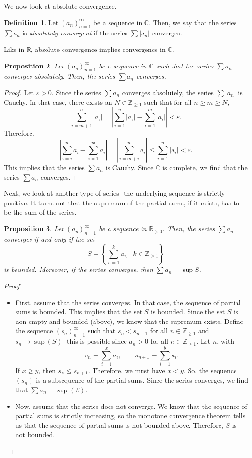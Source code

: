 \documentclass[a4paper, openany]{memoir}
\theoremstyle{definition}
\newtheorem{definition}{Definition}[section]
\theoremstyle{plain}
\newtheorem{proposition}[definition]{Proposition}
\begin{document}
We now look at absolute convergence.
\begin{definition}
Let $(a_n)_{n=1}^{\infty}$ be a sequence in $\mathbb{C}$. Then, we say that the series $\sum a_n$ is \emph{absolutely convergent} if the series $\sum |a_n|$ converges.
\end{definition}
\noindent Like in $\mathbb{R}$, absolute convergence implies convergence in $\mathbb{C}$.
\begin{proposition}
Let $(a_n)_{n=1}^{\infty}$ be a sequence in $\mathbb{C}$ such that the series $\sum a_n$ converges absolutely. Then, the series $\sum a_n$ converges.
\end{proposition}
\begin{proof}
Let $\varepsilon > 0$. Since the series $\sum a_n$ converges absolutely, the series $\sum |a_n|$ is Cauchy. In that case, there exists an $N \in \mathbb{Z}_{\geqslant 1}$ such that for all $n \geqslant m \geqslant N$,
\[\sum_{i=m+1}^n |a_i| = \left|\sum_{i=1}^n |a_i| - \sum_{i=1}^m |a_i|\right| < \varepsilon.\]
Therefore,
\[\left|\sum_{i=i}^n a_i - \sum_{i=1}^m a_i\right| = \left|\sum_{i=m+i}^n a_i\right| \leqslant \sum_{i=1}^n |a_i| < \varepsilon.\]
This implies that the series $\sum a_n$ is Cauchy. Since $\mathbb{C}$ is complete, we find that the series $\sum a_n$ converges.
\end{proof}
\noindent Next, we look at another type of series- the underlying sequence is strictly positive. It turns out that the supremum of the partial sums, if it exists, has to be the sum of the series.
\begin{proposition}
Let $(a_n)_{n=1}^{\infty}$ be a sequence in $\mathbb{R}_{> 0}$. Then, the series $\sum a_n$ converges if and only if the set
\[S = \left\{\sum_{n=1}^k a_n \mid k \in \mathbb{Z}_{\geqslant 1}\right\}\]
is bounded. Moreover, if the series converges, then $\sum a_n = \sup S$.
\end{proposition}
\begin{proof}
\hspace*{0pt}
\begin{itemize}
    \item First, assume that the series converges. In that case, the sequence of partial sums is bounded. This implies that the set $S$ is bounded. Since the set $S$ is non-empty and bounded (above), we know that the supremum exists. Define the sequence $(s_n)_{n=1}^{\infty}$ such that $s_n < s_{n+1}$ for all $n \in \mathbb{Z}_{\geqslant 1}$ and $s_n \to \sup (S)$- this is possible since $a_n > 0$ for all $n \in \mathbb{Z}_{\geqslant 1}$. Let $n$, with
    \[s_n = \sum_{i=1}^{x} a_i, \qquad s_{n+1} = \sum_{i=1}^{y} a_i.\]
    If $x \geqslant y$, then $s_n \leqslant s_{n+1}$. Therefore, we must have $x < y$. So, the sequence $(s_n)$ is a subsequence of the partial sums. Since the series converges, we find that $\sum a_n = \sup (S)$.
    
    \item Now, assume that the series does not converge. We know that the sequence of partial sums is strictly increasing, so the monotone convergence theorem tells us that the sequence of partial sums is not bounded above. Therefore, $S$ is not bounded.
\end{itemize}
\end{proof}
\end{document}
